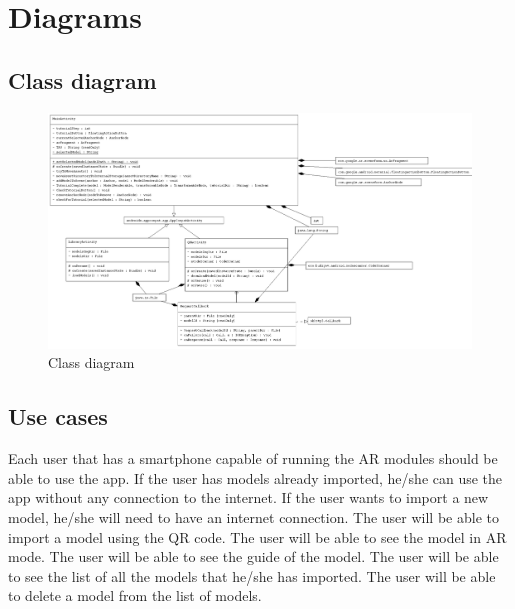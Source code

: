 \clearpage

\section{Diagrams}
\subsection*{Class diagram}

\begin{figure}[ht]
    \centering
    \includegraphics[width=1\textwidth]{img/ClassDiagram.png}
    \caption{Class diagram}
    \label{fig:ClassDiagram}
\end{figure}


\subsection*{Use cases}
Each user that has a smartphone capable of running the \ac{AR} modules should be able to use the app. If the user has models already imported, he/she can use the app without any connection to the internet. If the user wants to import a new model, he/she will need to have an internet connection. The user will be able to import a model using the \ac{QR} code. The user will be able to see the model in \ac{AR} mode. The user will be able to see the guide of the model. The user will be able to see the list of all the models that he/she has imported. The user will be able to delete a model from the list of models.

